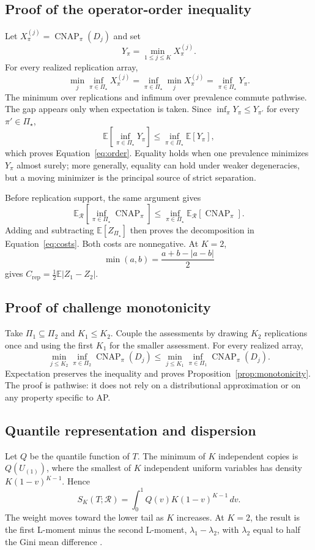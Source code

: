 \documentclass[11pt]{article}
\newcommand{\CNAP}{\operatorname{CNAP}}
\newcommand{\Regime}{\mathcal{R}}
\newcommand{\PSet}{\Pi_\star}
\newcommand{\E}{\mathbb{E}}
\theoremstyle{remark}
\begin{document}
\subsection{Proof of the operator-order inequality}

Let $X_\pi^{(j)}=\CNAP_\pi(D_j)$ and set
\[
Y_\pi=\min_{1\leq j\leq K}X_\pi^{(j)}.
\]
For every realized replication array,
\[
\min_j\inf_{\pi\in\PSet}X_\pi^{(j)}
=
\inf_{\pi\in\PSet}\min_jX_\pi^{(j)}
=
\inf_{\pi\in\PSet}Y_\pi.
\]
The minimum over replications and infimum over prevalence commute pathwise. The gap appears only when expectation is taken. Since $\inf_\pi Y_\pi\leq Y_{\pi'}$ for every $\pi'\in\PSet$,
\[
\E\left[\inf_{\pi\in\PSet}Y_\pi\right]
\leq
\inf_{\pi\in\PSet}\E[Y_\pi],
\]
which proves Equation~\eqref{eq:order}. Equality holds when one prevalence minimizes $Y_\pi$ almost surely; more generally, equality can hold under weaker degeneracies, but a moving minimizer is the principal source of strict separation.

Before replication support, the same argument gives
\[
\E_{\Regime}
\left[
\inf_{\pi\in\PSet}\CNAP_\pi
\right]
\leq
\inf_{\pi\in\PSet}
\E_{\Regime}[\CNAP_\pi].
\]
Adding and subtracting $\E[Z_{\PSet}]$ then proves the decomposition in Equation~\eqref{eq:costs}. Both costs are nonnegative. At $K=2$,
\[
\min(a,b)
=
\frac{a+b-|a-b|}{2}
\]
gives $C_{\mathrm{rep}}=\tfrac12\E|Z_1-Z_2|$.

\subsection{Proof of challenge monotonicity}

Take $\Pi_1\subseteq\Pi_2$ and $K_1\leq K_2$. Couple the assessments by drawing $K_2$ replications once and using the first $K_1$ for the smaller assessment. For every realized array,
\[
\min_{j\leq K_2}\inf_{\pi\in\Pi_2}\CNAP_\pi(D_j)
\leq
\min_{j\leq K_1}\inf_{\pi\in\Pi_1}\CNAP_\pi(D_j).
\]
Expectation preserves the inequality and proves Proposition~\ref{prop:monotonicity}. The proof is pathwise: it does not rely on a distributional approximation or on any property specific to AP.

\subsection{Quantile representation and dispersion}

Let $Q$ be the quantile function of $T$. The minimum of $K$ independent copies is $Q(U_{(1)})$, where the smallest of $K$ independent uniform variables has density $K(1-v)^{K-1}$. Hence
\begin{equation}
S_K(T;\Regime)
=
\int_0^1Q(v)K(1-v)^{K-1}\,dv.
\label{eq:quantile-weight}
\end{equation}
The weight moves toward the lower tail as $K$ increases. At $K=2$, the result is the first L-moment minus the second L-moment, $\lambda_1-\lambda_2$, with $\lambda_2$ equal to half the Gini mean difference \cite{hosking1990lmoments}.
\end{document}
